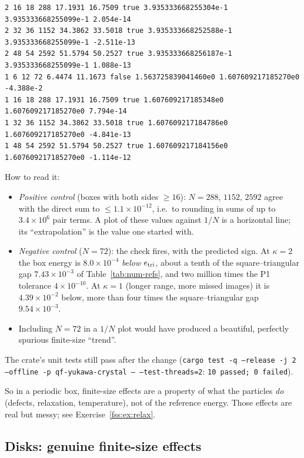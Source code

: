 \begin{numbox}
\begin{lstlisting}[language={},basicstyle=\ttfamily\scriptsize,title={yukawa\_crystal fss-lattice}]
2 16 18 288 17.1931 16.7509 true 3.935333668255304e-1 3.935333668255099e-1 2.054e-14
2 32 36 1152 34.3862 33.5018 true 3.935333668252588e-1 3.935333668255099e-1 -2.511e-13
2 48 54 2592 51.5794 50.2527 true 3.935333668256187e-1 3.935333668255099e-1 1.088e-13
1 6 12 72 6.4474 11.1673 false 1.563725839041460e0 1.607609217185270e0 -4.388e-2
1 16 18 288 17.1931 16.7509 true 1.607609217185348e0 1.607609217185270e0 7.794e-14
1 32 36 1152 34.3862 33.5018 true 1.607609217184786e0 1.607609217185270e0 -4.841e-13
1 48 54 2592 51.5794 50.2527 true 1.607609217184156e0 1.607609217185270e0 -1.114e-12
\end{lstlisting}
How to read it:
\begin{itemize}
\item \emph{Positive control} (boxes with both sides $\ge16$): $N=288$, $1152$, $2592$ agree with the direct sum to
$\le1.1\times10^{-12}$, i.e.\ to rounding in sums of up to $3.4\times10^6$ pair terms. A plot of these values against
$1/N$ is a horizontal line; its ``extrapolation'' is the value one started with.
\item \emph{Negative control} ($N=72$): the check fires, with the predicted sign. At $\kappa=2$ the box energy is
$8.0\times10^{-4}$ \emph{below} $e_{\rm tri}$, about a tenth of the square--triangular gap $7.43\times10^{-3}$ of
Table~\ref{tab:num-refs}, and two million times the P1 tolerance $4\times10^{-10}$. At $\kappa=1$ (longer range, more
missed images) it is $4.39\times10^{-2}$ below, more than four times the square--triangular gap $9.54\times10^{-3}$.
\item Including $N=72$ in a $1/N$ plot would have produced a beautiful, perfectly spurious finite-size ``trend''.
\end{itemize}
The crate's unit tests still pass after the change (\texttt{cargo test -q --release -j 2 --offline -p
qf-yukawa-crystal -- --test-threads=2}: \texttt{10 passed; 0 failed}).
\end{numbox}

So in a periodic box, finite-size effects are a property of what the particles \emph{do} (defects, relaxation,
temperature), not of the reference energy. Those effects are real but messy; see Exercise~\ref{fss:ex:relax}.

\subsection{Disks: genuine finite-size effects}\label{fss:sec:disk}

